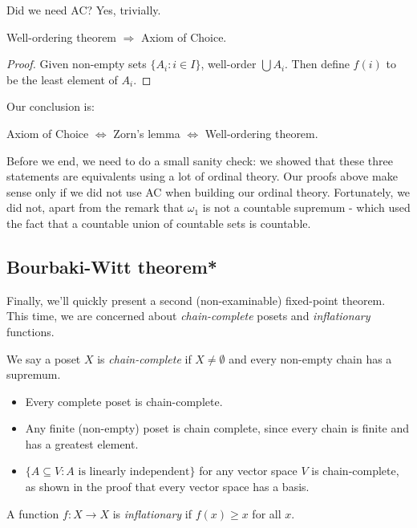 \documentclass[a4paper]{article}
\begin{document}
Did we need AC? Yes, trivially.
\begin{thm}
  Well-ordering theorem $\Rightarrow $ Axiom of Choice.
\end{thm}

\begin{proof}
  Given non-empty sets $\{A_i: i\in I\}$, well-order $\bigcup A_i$. Then define $f(i)$ to be the least element of $A_i$.
\end{proof}
Our conclusion is:
\begin{center}
  Axiom of Choice $\Leftrightarrow$ Zorn's lemma $\Leftrightarrow$ Well-ordering theorem.
\end{center}
Before we end, we need to do a small sanity check: we showed that these three statements are equivalents using a lot of ordinal theory.  Our proofs above make sense only if we did not use AC when building our ordinal theory. Fortunately, we did not, apart from the remark that $\omega_1$ is not a countable supremum - which used the fact that a countable union of countable sets is countable.

\subsection{Bourbaki-Witt theorem*}
Finally, we'll quickly present a second (non-examinable) fixed-point theorem. This time, we are concerned about \emph{chain-complete} posets and \emph{inflationary} functions.

\begin{defi}
  We say a poset $X$ is \emph{chain-complete} if $X \not=\emptyset$ and every non-empty chain has a supremum.
\end{defi}

\begin{eg}\leavevmode
  \begin{itemize}
    \item Every complete poset is chain-complete.
    \item Any finite (non-empty) poset is chain complete, since every chain is finite and has a greatest element.
    \item $\{A\subseteq V: A\text{ is linearly independent}\}$ for any vector space $V$ is chain-complete, as shown in the proof that every vector space has a basis.
  \end{itemize}
\end{eg}

\begin{defi}
  A function $f: X\to X$ is \emph{inflationary} if $f(x) \geq x$ for all $x$.
\end{defi}
\end{document}
